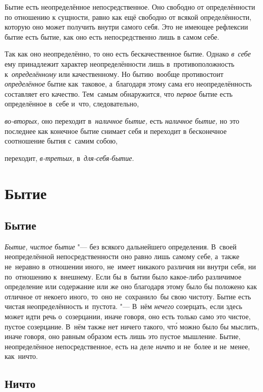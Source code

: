Бытие есть неопределённое непосредственное. Оно свободно от определённости по
отношению к сущности, равно как ещё свободно от всякой определённости, которую
оно может получить внутри самого себя. Это не имеющее рефлексии бытие есть
бытие, как оно есть непосредственно лишь в самом себе.

Так как оно неопределённо, то оно есть бескачественное бытие. Однако
{\em в~себе} ему принадлежит характер неопределённости лишь в~противоположность
к~{\em определённому} или качественному. Но бытию~вообще противостоит
{\em определённое} бытие как~таковое, а~благодаря этому сама его
неопределённость составляет его качество. Тем~самым обнаружится, что
{\em первое} бытие есть определённое в~себе и~что, следовательно,

{\em во-вторых,} оно переходит в~{\em наличное бытие,} есть
{\em наличное бытие,} но это последнее как конечное бытие снимает себя
и переходит в бесконечное соотношение бытия с~самим собою,

переходит, {\em в-третьих,} в~{\em для-себя-бытие}.

\section{Бытие}

\subsection{Бытие}


{\em Бытие, чистое бытие} "--- без всякого дальнейшего определения.
В~своей неопределённой непосредственности оно равно лишь самому себе, а~также
не~неравно в~отношении иного, не~имеет никакого различия ни внутри себя, ни
по~отношению к~внешнему. Если бы в~бытии было какое-либо различимое определение
или содержание или же оно благодаря этому было бы положено как отличное от
некоего иного, то~оно не~сохранило~бы свою чистоту. Бытие есть чистая
неопределённость и~пустота. "--- В~нём {\em нечего} созерцать, если здесь может
идти речь о~созерцании, иначе говоря, оно есть только само это чистое, пустое
созерцание. В~нём также нет ничего такого, чт\'{о} можно было бы мыслить, иначе
говоря, оно равным образом есть лишь это пустое мышление. Бытие, неопределённое
непосредственное, есть на деле {\em ничто} и не~более и не~менее, как~ничто.

\subsection{Ничто}

